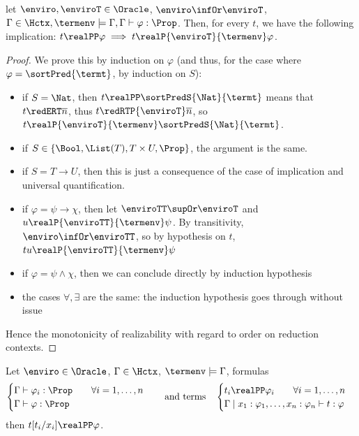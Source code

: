 \begingroup
{}
\begin{proposition}
  let $\enviro, \enviroT \in \Oracle$, $\enviro \infOr \enviroT$, $\Gamma \in \Hctx, \termenv \models \Gamma, \Gamma \vdash \varphi : \Prop$. Then, for every $t$, we have the following implication: $t \realPP \varphi \implies t \realP{\enviroT}{\termenv} \varphi$.
\end{proposition}
\endgroup
\begin{proof}%
  We prove this by induction on $\varphi$ (and thus, for the case where $\varphi = \sortPred{\termt}$, by induction on $S$):
  \begin{itemize}
  \item if $S = \Nat$, then $t \realPP \sortPredS{\Nat}{\termt}$ means that $t \redERT \overline n$, thus $t \redRTP{\enviroT} \overline n$, so $t \realP{\enviroT}{\termenv} \sortPredS{\Nat}{\termt}$.
  \item if $S \in \{\Bool, \List(T), T \times U, \Prop\}$, the argument is the same.
  \item if $S = T \to U$, then this is just a consequence of the case of implication and universal quantification.
  \item if $\varphi = \psi \to \chi$, then let $\enviroTT \supOr\enviroT$ and $u \realP{\enviroTT}{\termenv} \psi$. By transitivity, $\enviro \infOr \enviroTT$, so by hypothesis on $t$, $tu \realP{\enviroTT}{\termenv} \psi$
  \item if $\varphi = \psi \land \chi$, then we can conclude directly by induction hypothesis
  \item the cases $\forall, \exists$ are the same: the induction hypothesis goes through without issue
  \end{itemize}
  Hence the monotonicity of realizability with regard to order on reduction contexts.
\end{proof}



\begingroup
{}

\begin{theorem}[Adequacy]
  Let $\enviro \in \Oracle$, $\Gamma \in \Hctx$, $\termenv \models \Gamma$, formulas
  \[\begin{cases}
  \Gamma\vdash \varphi_i : \Prop \qquad \forall i = 1,\ldots,n\\
  \Gamma\vdash \varphi : \Prop
  \end{cases}
  \quad \text{and terms}\quad
  \begin{cases}
  t_i \realPP \varphi_i \qquad \forall i = 1,\ldots,n\\
  \Gamma \mid x_1 : \varphi_1,\ldots,x_n : \varphi_n \vdash t : \varphi
  \end{cases}\]
  then $t[t_i/x_i] \realPP \varphi$.
\end{theorem}

